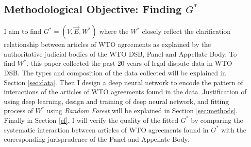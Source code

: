 \subsection{Methodological Objective: Finding $G^*$} \label{subsec:obj}
I aim to find $G^* = (V, \vec{E}, W^*)$ where the $W^*$ closely reflect the clarification relationship between articles of WTO agreements as explained by the authoritative judicial bodies of the WTO DSB, Panel and Appellate Body. To find $W^*$, this paper collected the past 20 years of legal dispute data in WTO DSB. The types and composition of the data collected will be explained in Section \ref{sec:data}.
Then I design a deep neural network to encode the pattern of interactions of the articles of WTO agreements found in the data. Justification of using deep learning, design and training of deep neural network, and fitting process of $W^*$ using \textit{Random Forest} will be explained in Section \ref{sec:methods}.
Finally in Section \ref{ef}, I will verify the quality of the fitted $G^*$ by comparing the systematic interaction between articles of WTO agreements found in $G^*$ with the corresponding jurisprudence of the Panel and Appellate Body.








